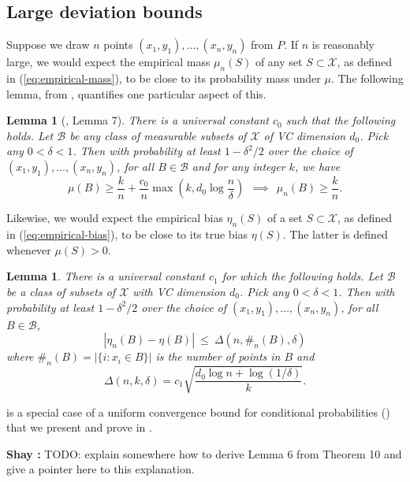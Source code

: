 \documentclass{article}
\def\X{{\mathcal X}}
\def\B{{\mathcal B}}
\newtheorem{lemma}[theorem]{Lemma}
\newcommand{\comment}[3]{{\color{#1} {\bf #2 :} #3}}
\newcommand{\shay}[1]{\comment{purple}{Shay}{#1}}
\begin{document}
\subsection{Large deviation bounds}

Suppose we draw $n$ points $(x_1, y_1), \ldots, (x_n, y_n)$ from $P$. If $n$ is reasonably large, we would expect the empirical mass $\mu_n(S)$ of any set $S \subset \X$, as defined in (\ref{eq:empirical-mass}), to be close to its probability mass under $\mu$. The following lemma, from \cite{ChaudhuriDasgupta2010}, quantifies one particular aspect of this.
\begin{lemma}[\cite{ChaudhuriDasgupta2010}, Lemma 7]
There is a universal constant $c_0$ such that the following holds. Let $\B$ be any class of measurable subsets of $\X$ of VC dimension $d_0$. Pick any $0 < \delta < 1$. Then with probability at least $1-\delta^2/2$ over the choice of $(x_1, y_1), \ldots, (x_n, y_n)$, for all $B \in \B$ and for any integer $k$, we have
$$ \mu(B) \geq \frac{k}{n} + \frac{c_0}{n} \max \left( k, d_0 \log \frac{n}{\delta} \right)
\ \ \implies \ \ 
\mu_{n}(B) \geq \frac{k}{n} .$$
\label{lemma:points-in-balls}
\end{lemma}

Likewise, we would expect the empirical bias $\eta_n(S)$ of a set $S \subset \X$, as defined in (\ref{eq:empirical-bias}), to be close to its true bias $\eta(S)$. The latter is defined whenever $\mu(S) > 0$.
\begin{lemma}
There is a universal constant $c_1$ for which the following holds. Let $\B$ be a class of subsets of $\X$ with VC dimension $d_0$. Pick any $0 < \delta < 1$. Then with probability at least $1-\delta^2/2$ over the choice of $(x_1, y_1), \ldots, (x_n, y_n)$, for all $B \in \B$,
  $$ \left| \eta_n(B) - \eta(B) \right| \ \leq \ \Delta(n, \#_n(B), \delta) $$
where $\#_n(B) = |\{i: x_i \in B\}|$ is the number of points in $B$ and 
\begin{equation}
\Delta(n,k,\delta) = c_1 \sqrt{\frac{d_0 \log n + \log (1/\delta)}{k}} .
\label{eq:delta-defn}
\end{equation}
\label{lemma:bias}
\end{lemma}

 is a special case of a uniform convergence bound for conditional probabilities () 
that we present and prove in \Cref{sec:ucecm}.

\shay{TODO: explain somewhere how to derive Lemma 6 from Theorem 10 and give a pointer here to this explanation.}
\end{document}
